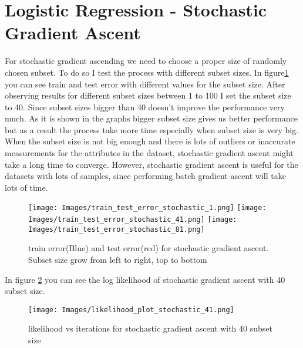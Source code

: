 \documentclass[12pt]{article}
\begin{document}
\section{Logistic Regression - Stochastic Gradient Ascent}
For stochastic gradient ascending we need to choose a proper size of randomly chosen subset. To do so I test the process with different subset sizes. In figure\ref{fig:stochastic_subset_size} you can see train and test error with different values for the subset size. After observing results for different subset sizes between 1 to 100 I set the subset size to 40. Since subset sizes bigger than 40 doesn't improve the performance very much. As it is shown in the graphs bigger subset size gives us better performance but as a result the process take more time especially when subset size is very big. When the subset size is not big enough and there is lots of outliers or inaccurate measurements for the attributes in the dataset, stochastic gradient ascent might take a long time to converge. However, stochastic gradient ascent is useful for the datasets with lots of samples, since performing batch gradient ascent will take lots of time.
\begin{figure}
  \caption{train error(Blue) and test error(red) for stochastic gradient ascent. Subset size grow from left to right, top to bottom}
  \centering
  \texttt{[image: Images/train\_test\_error\_stochastic\_1.png]}
  \texttt{[image: Images/train\_test\_error\_stochastic\_41.png]}
  \texttt{[image: Images/train\_test\_error\_stochastic\_81.png]}
  \label{fig:stochastic_subset_size}
\end{figure}
In figure \ref{fig:stochastic_loglikelihood} you can see the log likelihood of stochastic gradient ascent with 40 subset size.
\begin{figure}
  \caption{likelihood vs iterations for stochastic gradient ascent with 40 subset size}
  \centering
  \texttt{[image: Images/likelihood\_plot\_stochastic\_41.png]}  		\label{fig:stochastic_loglikelihood}
\end{figure}
\newpage
\end{document}

